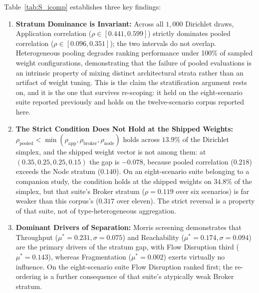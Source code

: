 \documentclass[preprint,3p]{elsarticle}
\begin{document}
\noindent Table~\ref{tab:S_icomp} establishes three key findings:
\begin{enumerate}
    \item \textbf{Stratum Dominance is Invariant:} Across all $1{,}000$ Dirichlet draws, Application correlation ($\rho \in [0.441, 0.599]$) strictly dominates pooled correlation ($\rho \in [0.096, 0.351]$); the two intervals do not overlap. Heterogeneous pooling degrades ranking performance under 100\% of sampled weight configurations, demonstrating that the failure of pooled evaluations is an intrinsic property of mixing distinct architectural strata rather than an artifact of weight tuning. This is the claim the stratification argument rests on, and it is the one that survives re-scoping: it held on the eight-scenario suite reported previously and holds on the twelve-scenario corpus reported here.
    \item \textbf{The Strict Condition Does Not Hold at the Shipped Weights:} $\rho_{\text{pooled}} < \min(\rho_{\text{app}}, \rho_{\text{broker}}, \rho_{\text{node}})$ holds across $13.9\%$ of the Dirichlet simplex, and the shipped weight vector is not among them: at $(0.35, 0.25, 0.25, 0.15)$ the gap is $-0.078$, because pooled correlation ($0.218$) exceeds the Node stratum ($0.140$). On an eight-scenario suite belonging to a companion study, the condition holds at the shipped weights on $34.8\%$ of the simplex, but that suite's Broker stratum ($\rho = 0.119$ over six scenarios) is far weaker than this corpus's ($0.317$ over eleven). The strict reversal is a property of that suite, not of type-heterogeneous aggregation.
    \item \textbf{Dominant Drivers of Separation:} Morris screening demonstrates that Throughput ($\mu^* = 0.231, \sigma = 0.075$) and Reachability ($\mu^* = 0.174, \sigma = 0.094$) are the primary drivers of the stratum gap, with Flow Disruption third ($\mu^* = 0.143$), whereas Fragmentation ($\mu^* = 0.002$) exerts virtually no influence. On the eight-scenario suite Flow Disruption ranked first; the re-ordering is a further consequence of that suite's atypically weak Broker stratum.
\end{enumerate}
\end{document}

